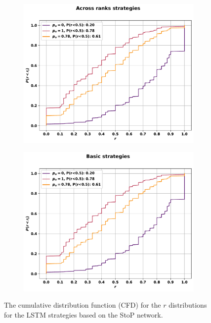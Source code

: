 \begin{figure}[!htbp]
\begin{subfigure}{.45\textwidth}
    \includegraphics[width=\textwidth]{src/chapters/07/img/cfd_to_probability_across_ranks_strategies.pdf}
    \end{subfigure}\hfill
    \begin{subfigure}{.45\textwidth}
    \includegraphics[width=\textwidth]{src/chapters/07/img/cfd_to_probability_basic_strategies.pdf}
    \end{subfigure}
    \caption{The cumulative distribution function (CFD)
    for the \(r\) distributions for the LSTM strategies based on the StoP
    network.}\label{fig:cfd_s_to_p}
\end{figure}

